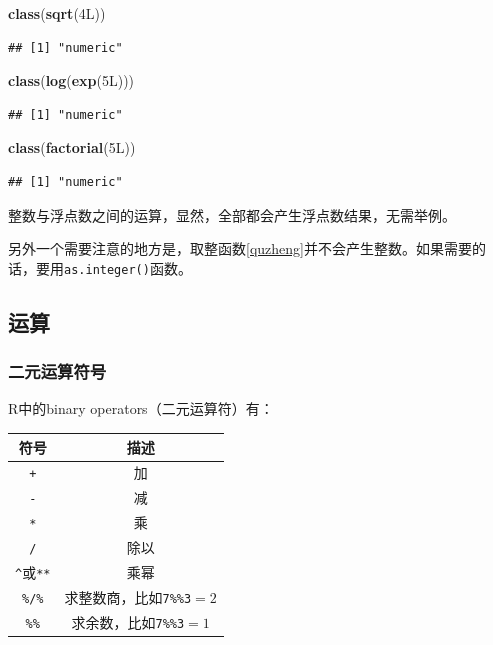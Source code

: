 \documentclass[]{book}
\newenvironment{Shaded}{\begin{snugshade}}{\end{snugshade}}
\newcommand{\KeywordTok}[1]{\textcolor[rgb]{0.13,0.29,0.53}{\textbf{#1}}}
\newcommand{\NormalTok}[1]{#1}
\begin{document}
\begin{Shaded}
\begin{Highlighting}[]
\KeywordTok{class}\NormalTok{(}\KeywordTok{sqrt}\NormalTok{(4L))}
\end{Highlighting}
\end{Shaded}

\begin{verbatim}
## [1] "numeric"
\end{verbatim}

\begin{Shaded}
\begin{Highlighting}[]
\KeywordTok{class}\NormalTok{(}\KeywordTok{log}\NormalTok{(}\KeywordTok{exp}\NormalTok{(5L)))}
\end{Highlighting}
\end{Shaded}

\begin{verbatim}
## [1] "numeric"
\end{verbatim}

\begin{Shaded}
\begin{Highlighting}[]
\KeywordTok{class}\NormalTok{(}\KeywordTok{factorial}\NormalTok{(5L))}
\end{Highlighting}
\end{Shaded}

\begin{verbatim}
## [1] "numeric"
\end{verbatim}

整数与浮点数之间的运算，显然，全部都会产生浮点数结果，无需举例。

另外一个需要注意的地方是，取整函数\ref{quzheng}并不会产生整数。如果需要的话，要用\texttt{as.integer()}函数。

\hypertarget{arithmetic}{%
\subsection{运算}\label{arithmetic}}

\hypertarget{math-binary-operators}{%
\subsubsection{二元运算符号}\label{math-binary-operators}}

R中的binary operators（二元运算符）有：

\begin{longtable}[]{@{}cc@{}}
\toprule
符号 & 描述\tabularnewline
\midrule
\endhead
\texttt{+} & 加\tabularnewline
\texttt{-} & 减\tabularnewline
\texttt{*} & 乘\tabularnewline
\texttt{/} & 除以\tabularnewline
\texttt{\^{}}或\texttt{**} & 乘幂\tabularnewline
\texttt{\%/\%} & 求整数商，比如\texttt{7\%\%3}\(=2\)\tabularnewline
\texttt{\%\%} & 求余数，比如\texttt{7\%\%3}\(=1\)\tabularnewline
\bottomrule
\end{longtable}
\end{document}
